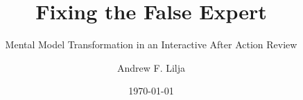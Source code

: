 \title{Fixing the False Expert}
\subtitle{Mental Model Transformation in an Interactive After Action Review}
\author{Andrew F. Lilja}
\date{\today}

\maketitle

\tableofcontents
